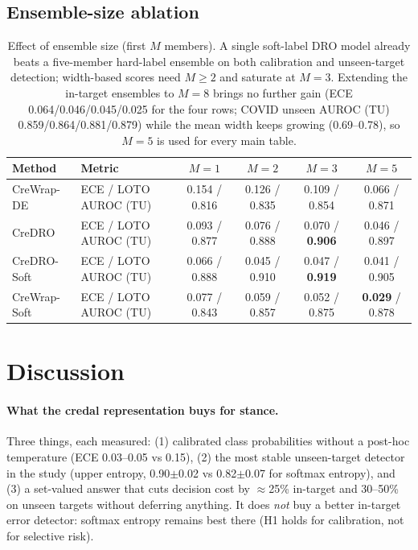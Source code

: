 \documentclass[11pt,a4paper]{article}
\newcommand{\best}[1]{\textbf{#1}}
\begin{document}
\subsection{Ensemble-size ablation}

\begin{table}[h]
\centering\small
\begin{tabular}{l l cccc}
\toprule
Method & Metric & $M=1$ & $M=2$ & $M=3$ & $M=5$ \\
\midrule
CreWrap-DE & ECE / LOTO AUROC (TU) & 0.154 / 0.816 & 0.126 / 0.835 & 0.109 / 0.854 & 0.066 / 0.871 \\
CreDRO & ECE / LOTO AUROC (TU) & 0.093 / 0.877 & 0.076 / 0.888 & 0.070 / \best{0.906} & 0.046 / 0.897 \\
CreDRO-Soft & ECE / LOTO AUROC (TU) & 0.066 / 0.888 & 0.045 / 0.910 & 0.047 / \best{0.919} & 0.041 / 0.905 \\
CreWrap-Soft & ECE / LOTO AUROC (TU) & 0.077 / 0.843 & 0.059 / 0.857 & 0.052 / 0.875 & \best{0.029} / 0.878 \\
\bottomrule
\end{tabular}
\caption{Effect of ensemble size (first $M$ members). A single soft-label DRO model already beats a five-member hard-label ensemble on both calibration and unseen-target detection; width-based scores need $M\ge2$ and saturate at $M=3$. Extending the in-target ensembles to $M=8$ brings no further gain (ECE 0.064/0.046/0.045/0.025 for the four rows; COVID unseen AUROC (TU) 0.859/0.864/0.881/0.879) while the mean width keeps growing (0.69--0.78), so $M=5$ is used for every main table.}
\label{tab:abl}
\end{table}

\section{Discussion}

\paragraph{What the credal representation buys for stance.} Three things, each measured: (1) calibrated class probabilities without a post-hoc temperature (ECE 0.03--0.05 vs 0.15), (2) the most stable unseen-target detector in the study (upper entropy, 0.90$\pm$0.02 vs 0.82$\pm$0.07 for softmax entropy), and (3) a set-valued answer that cuts decision cost by $\approx$25\% in-target and 30--50\% on unseen targets without deferring anything. It does \emph{not} buy a better in-target error detector: softmax entropy remains best there (H1 holds for calibration, not for selective risk).
\end{document}
